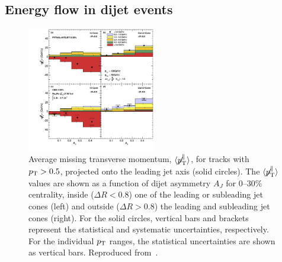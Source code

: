 \subsection{Energy flow in dijet events}
\begin{figure}[!ht]
\begin{center}
\includegraphics[width=0.5\textwidth]{jetfigures/missingPtParallel-Corrected-data-InConeOutConeDPhiCut_ntv6_2.pdf}
\caption{Average missing transverse momentum,
$\langle \displaystyle{\not} p_{\mathrm{T}}^{\parallel} \rangle$,
for tracks with $\mbox{$p_{\mathrm{T}}$} > 0.5$\GeVc, projected onto the leading jet axis (solid circles).
The $\langle \displaystyle{\not} p_{\mathrm{T}}^{\parallel} \rangle$ values are
shown as a function of dijet asymmetry
$A_J$ for 0--30\% centrality, inside ($\Delta R < 0.8$) one of the leading or subleading jet cones (left) and
outside ($\Delta R > 0.8$) the leading and subleading jet cones (right).
For the solid circles, vertical bars and brackets represent
the statistical and systematic uncertainties, respectively.
For the individual $\mbox{$p_{\mathrm{T}}$}$ ranges, the statistical uncertainties are shown as vertical bars.
Reproduced from~\cite{Chatrchyan:2011sx}.}
\label{fig:GR:CMS_missingpT}
\end{center}
\end{figure}

